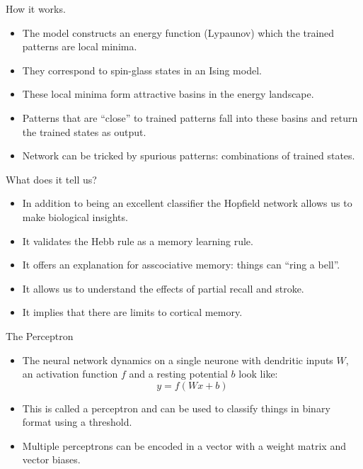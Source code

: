 \documentclass[
  ignorenonframetext,
]{beamer}
\begin{document}
\begin{frame}{How it works.}
\protect\hypertarget{how-it-works.}{}
\begin{itemize}
\item
  The model constructs an energy function (Lypaunov) which the trained
  patterns are local minima.
\item
  They correspond to spin-glass states in an Ising model.
\item
  These local minima form attractive basins in the energy landscape.
\item
  Patterns that are ``close'' to trained patterns fall into these basins
  and return the trained states as output.
\item
  Network can be tricked by spurious patterns: combinations of trained
  states.
\end{itemize}
\end{frame}

\begin{frame}{What does it tell us?}
\protect\hypertarget{what-does-it-tell-us}{}
\begin{itemize}
\item
  In addition to being an excellent classifier the Hopfield network
  allows us to make biological insights.
\item
  It validates the Hebb rule as a memory learning rule.
\item
  It offers an explanation for asscociative memory: things can ``ring a
  bell''.
\item
  It allows us to understand the effects of partial recall and stroke.
\item
  It implies that there are limits to cortical memory.
\end{itemize}
\end{frame}

\begin{frame}{The Perceptron}
\protect\hypertarget{the-perceptron}{}
\begin{itemize}
\item
  The neural network dynamics on a single neurone with dendritic inputs
  \(W\), an activation function \(f\) and a resting potential \(b\) look
  like: \[y = f(W x + b)\]
\item
  This is called a perceptron and can be used to classify things in
  binary format using a threshold.
\item
  Multiple perceptrons can be encoded in a vector with a weight matrix
  and vector biases.
\end{itemize}
\end{frame}
\end{document}
